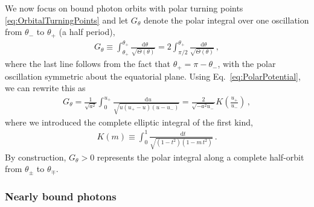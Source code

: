 \documentclass[graybox,envcountchap]{svmult}
\newcommand{\ed}{\mathop{}\!\mathrm{d}}
\newcommand{\pa}[1]{\left(#1\right)}
\begin{document}
We now focus on bound photon orbits with polar turning points \eqref{eq:OrbitalTurningPoints} and let $G_\theta$ denote the polar integral over one oscillation from $\theta_-$ to $\theta_+$ (a half period),
\begin{align}
    G_\theta\equiv\int_{\theta_+}^{\theta_+}\frac{\ed\theta}{\sqrt{\Theta(\theta)}}
    =2\int_{\pi/2}^{\theta_+}\frac{\ed\theta}{\sqrt{\Theta(\theta)}}\,,
\end{align}
where the last line follows from the fact that $\theta_+=\pi-\theta_-$, with the polar oscillation symmetric about the equatorial plane.
Using Eq.~\eqref{eq:PolarPotential}, we can rewrite this as
\begin{align}
    \label{eq:HalfOrbitIntegral}
    G_\theta=\frac{1}{\sqrt{a^2}}\int_0^{u_+}\frac{\ed u}{\sqrt{u\pa{u_+-u}\pa{u-u_-}}}
    =\frac{2}{\sqrt{-a^2u_-}}K\!\pa{\frac{u_+}{u_-}}\,,
\end{align}
where we introduced the complete elliptic integral of the first kind,
\begin{align}
    K(m)\equiv\int_0^1\frac{\ed t}{\sqrt{\pa{1-t^2}\pa{1-m\, t^2}}}\,.
\end{align}
By construction, $G_\theta>0$ represents the polar integral along a complete half-orbit from $\theta_\pm$ to $\theta_\mp$.

\subsubsection*{Nearly bound photons}
\end{document}
